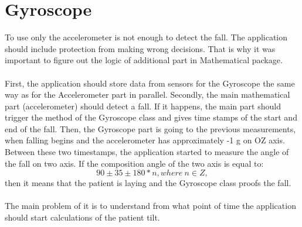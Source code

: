 \documentclass[conference,12pt]{IEEETran}
\begin{document}
\section{Gyroscope}
To use only the accelerometer is not enough to detect the fall. The application should include protection from making wrong decisions. That is why it was important to figure out the logic of additional part in Mathematical package.\\\\
First, the application should store data from sensors for the Gyroscope the same way as for the Accelerometer part in parallel. Secondly, the main mathematical part (accelerometer) should detect a fall. If it happens, the main part should trigger the method of the Gyroscope class and gives time stamps of the start and end of the fall. Then, the Gyroscope part is going to the previous measurements, when falling begins and the accelerometer has approximately -1 g on OZ axis. Between these two timestamps, the application started to measure the angle of the fall on two axis. If the composition angle of the two axis is equal to: $$90 \pm 35 \pm 180 * n, where\ n \in Z,$$
then it means that the patient is laying and the Gyroscope class proofs the fall.\\\\
The main problem of it is to understand from what point of time the application should start calculations of the patient tilt.
\end{document}
